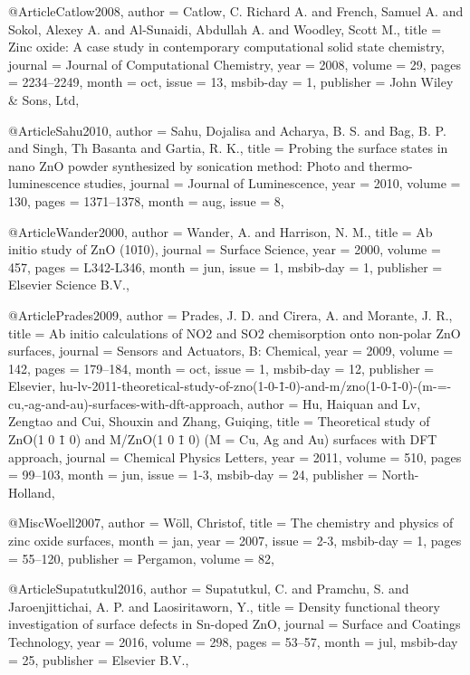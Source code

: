 
@Article{Catlow2008,
  author    = {Catlow, C. Richard A. and French, Samuel A. and Sokol, Alexey A. and Al-Sunaidi, Abdullah A. and Woodley, Scott M.},
  title     = {Zinc oxide: A case study in contemporary computational solid state chemistry},
  journal   = {Journal of Computational Chemistry},
  year      = {2008},
  volume    = {29},
  pages     = {2234--2249},
  month     = oct,
  issue     = {13},
  msbib-day = {1},
  publisher = {John Wiley \& Sons, Ltd},
}

@Article{Sahu2010,
  author  = {Sahu, Dojalisa and Acharya, B. S. and Bag, B. P. and Singh, Th Basanta and Gartia, R. K.},
  title   = {Probing the surface states in nano ZnO powder synthesized by sonication method: Photo and thermo-luminescence studies},
  journal = {Journal of Luminescence},
  year    = {2010},
  volume  = {130},
  pages   = {1371--1378},
  month   = aug,
  issue   = {8},
}

@Article{Wander2000,
  author    = {Wander, A. and Harrison, N. M.},
  title     = {Ab initio study of ZnO (101̄0)},
  journal   = {Surface Science},
  year      = {2000},
  volume    = {457},
  pages     = {L342-L346},
  month     = jun,
  issue     = {1},
  msbib-day = {1},
  publisher = {Elsevier Science B.V.},
}

@Article{Prades2009,
  author    = {Prades, J. D. and Cirera, A. and Morante, J. R.},
  title     = {Ab initio calculations of NO2 and SO2 chemisorption onto non-polar ZnO surfaces},
  journal   = {Sensors and Actuators, B: Chemical},
  year      = {2009},
  volume    = {142},
  pages     = {179--184},
  month     = oct,
  issue     = {1},
  msbib-day = {12},
  publisher = {Elsevier},
}
{hu-lv-2011-theoretical-study-of-zno(1-0-1̄-0)-and-m/zno(1-0-1̄-0)-(m-=-cu,-ag-and-au)-surfaces-with-dft-approach,
  author    = {Hu, Haiquan and Lv, Zengtao and Cui, Shouxin and Zhang, Guiqing},
  title     = {Theoretical study of ZnO(1 0 1̄ 0) and M/ZnO(1 0 1̄ 0) (M = Cu, Ag and Au) surfaces with DFT approach},
  journal   = {Chemical Physics Letters},
  year      = {2011},
  volume    = {510},
  pages     = {99--103},
  month     = jun,
  issue     = {1-3},
  msbib-day = {24},
  publisher = {North-Holland},
}

@Misc{Woell2007,
  author    = {Wöll, Christof},
  title     = {The chemistry and physics of zinc oxide surfaces},
  month     = jan,
  year      = {2007},
  issue     = {2-3},
  msbib-day = {1},
  pages     = {55--120},
  publisher = {Pergamon},
  volume    = {82},
}

@Article{Supatutkul2016,
  author    = {Supatutkul, C. and Pramchu, S. and Jaroenjittichai, A. P. and Laosiritaworn, Y.},
  title     = {Density functional theory investigation of surface defects in Sn-doped ZnO},
  journal   = {Surface and Coatings Technology},
  year      = {2016},
  volume    = {298},
  pages     = {53--57},
  month     = jul,
  msbib-day = {25},
  publisher = {Elsevier B.V.},
}

